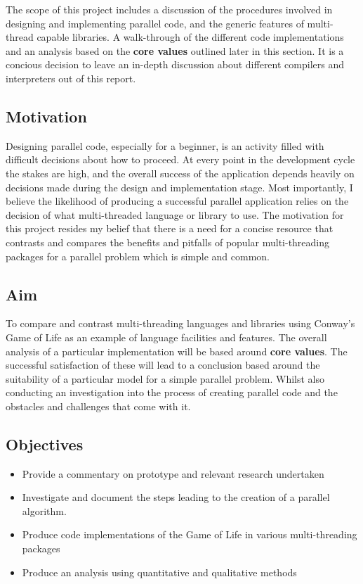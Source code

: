 \documentclass[11pt]{article} %
\begin{document}
The scope of this project includes a discussion of the procedures involved in designing and implementing parallel code, and the generic features of multi-thread capable libraries. A walk-through of the different code implementations and an analysis based on the {\bf core values} outlined later in this section. It is a concious decision to leave an in-depth discussion about different compilers and interpreters out of this report.
\pagestyle{fancy} %
\subsection{Motivation}
Designing parallel code, especially for a beginner, is an activity filled with difficult decisions about how to proceed. At every point in the development cycle the stakes are high, and the overall success of the application depends heavily on decisions made during the design and implementation stage. Most importantly, I believe the likelihood of producing a successful parallel application relies on the decision of what multi-threaded language or library to use. The motivation for this project resides my belief that there is a need for a concise resource that contrasts and compares the benefits and pitfalls of popular multi-threading packages for a parallel problem which is simple and common.
\subsection{Aim}
To compare and contrast multi-threading languages and libraries using Conway's Game of Life as an example of language facilities and features. The overall analysis of a particular implementation will be based around {\bf core values}. The successful satisfaction of these will lead to a conclusion based around the suitability of a particular model for a simple parallel problem. Whilst also conducting an investigation into the process of creating parallel code and the obstacles and challenges that come with it.
\subsection{Objectives}
\begin{itemize}
\item Provide a commentary on prototype and relevant research undertaken
\item Investigate and document the steps leading to the creation of a parallel algorithm.
\item Produce code implementations of the Game of Life in various multi-threading packages
\item Produce an analysis using quantitative and qualitative methods
\end{itemize}
\end{document}
